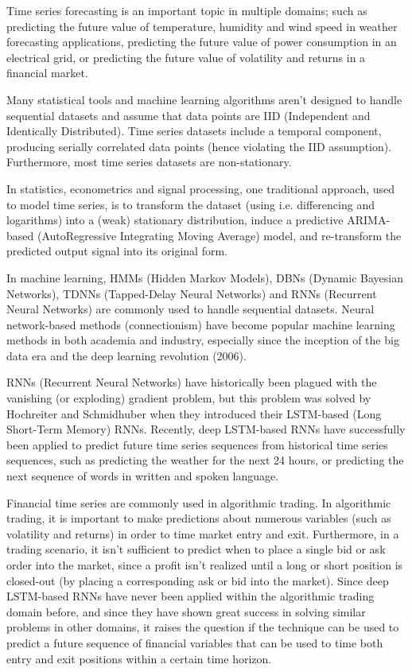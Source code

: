 

Time series forecasting is an important topic in multiple domains; such as predicting the future value of temperature, humidity and wind speed in weather forecasting applications, predicting the future value of power consumption in an electrical grid, or predicting the future value of volatility and returns in a financial market.

Many statistical tools and machine learning algorithms aren’t designed to handle sequential datasets and assume that data points are IID (Independent and Identically Distributed). Time series datasets include a temporal component, producing serially correlated data points (hence violating the IID assumption). Furthermore, most time series datasets are non-stationary.

In statistics, econometrics and signal processing, one traditional approach, used to model time series, is to transform the dataset (using i.e. differencing and logarithms) into a (weak) stationary distribution, induce a predictive ARIMA-based (AutoRegressive Integrating Moving Average) model, and re-transform the predicted output signal into its original form.

In machine learning, HMMs (Hidden Markov Models), DBNs (Dynamic Bayesian Networks), TDNNs (Tapped-Delay Neural Networks) and RNNs (Recurrent Neural Networks) are commonly used to handle sequential datasets. Neural network-based methods (connectionism) have become popular machine learning methods in both academia and industry, especially since the inception of the big data era and the deep learning revolution (2006).

RNNs (Recurrent Neural Networks) have historically been plagued with the vanishing (or exploding) gradient problem, but this problem was solved by Hochreiter and Schmidhuber when they introduced their LSTM-based (Long Short-Term Memory) RNNs. Recently, deep LSTM-based RNNs have successfully been applied to predict future time series sequences from historical time series sequences, such as predicting the weather for the next 24 hours, or predicting the next sequence of words in written and spoken language.

Financial time series are commonly used in algorithmic trading. In algorithmic trading, it is important to make predictions about numerous variables (such as volatility and returns) in order to time market entry and exit. Furthermore, in a trading scenario, it isn’t sufficient to predict when to place a single bid or ask order into the market, since a profit isn’t realized until a long or short position is closed-out (by placing a corresponding ask or bid into the market). Since deep LSTM-based RNNs have never been applied within the algorithmic trading domain before, and since they have shown great success in solving similar problems in other domains, it raises the question if the technique can be used to predict a future sequence of financial variables that can be used to time both entry and exit positions within a certain time horizon.

